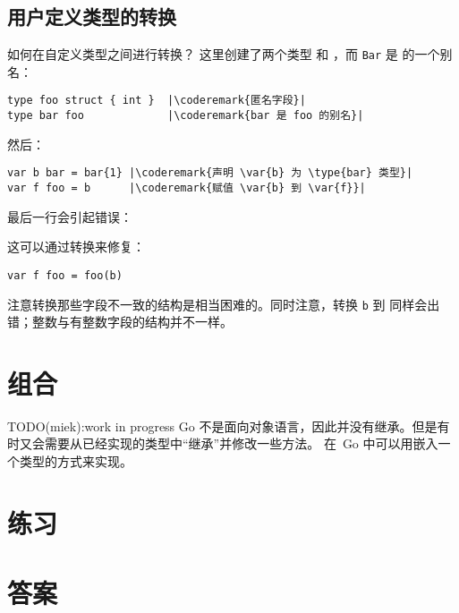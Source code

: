 \subsection{用户定义类型的转换}
如何在自定义类型之间进行转换？
这里创建了两个类型  和 ，而
\lstinline{Bar} 是  的一个别名：
\begin{lstlisting}
type foo struct { int }  |\coderemark{匿名字段}|
type bar foo             |\coderemark{bar 是 foo 的别名}|
\end{lstlisting}

然后：
\begin{lstlisting}
var b bar = bar{1} |\coderemark{声明 \var{b} 为 \type{bar} 类型}|
var f foo = b	   |\coderemark{赋值 \var{b} 到 \var{f}}|
\end{lstlisting}
最后一行会引起错误：

\noindent{}

\noindent{}这可以通过转换来修复：
\begin{lstlisting}
var f foo = foo(b)
\end{lstlisting}
注意转换那些字段不一致的结构是相当困难的。同时注意，转换
\lstinline{b} 到  同样会出错；整数与有整数字段的结构并不一样。

\section{组合}
TODO(miek):work in progress
Go 不是面向对象语言，因此并没有继承。但是有时又会需要从已经实现的类型中“继承”并修改一些方法。
在~Go 中可以用嵌入一个类型的方式来实现。

\section{练习}












\cleardoublepage
\section{答案}
\shipoutAnswer
